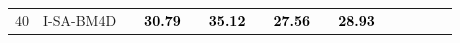 \documentclass[10pt, journal, twocolumn, final, a4paper]{IEEEtran}
\newcommand{\bsic}[1]{\textcolor{black}{\textit{#1}}}
\newcommand{\Bsic}[1]{\textcolor{black}{\textbf{\textit{#1}}}}
\newcommand{\Best}[1]{\textbf{\textcolor{black}{#1}}}
\begin{document}
\begin{table}[htp!]
\begin{center}
{\begin{tabular}{ c | l |c c | c c | c c | c c | c c | c c | c }
%
			\multirow{1}{*}{$40$}
			                      & I-SA-BM4D            & \bsic{     } & \Best{30.79} & \bsic{     } & \Best{35.12}  & \bsic{     } & \Best{27.56}  & \bsic{     } & \Best{28.93} &              &               &              &              &              \\

\end{tabular}}
\end{center}
\end{table}
\end{document}
